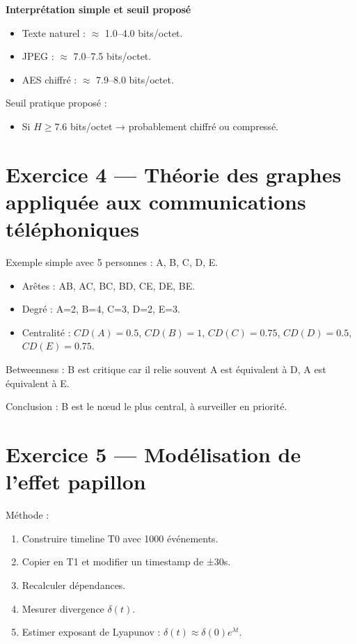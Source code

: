 \documentclass[12pt,a4paper]{article}
\begin{document}
	\textbf{Interprétation simple et seuil proposé}  
	\begin{itemize}
		\item Texte naturel : $\approx$ 1.0–4.0 bits/octet.
		\item JPEG : $\approx$ 7.0–7.5 bits/octet.
		\item AES chiffré : $\approx$ 7.9–8.0 bits/octet.
	\end{itemize}
	
	Seuil pratique proposé :  
	\begin{itemize}
		\item Si $H \geq 7.6$ bits/octet → probablement chiffré ou compressé.
	\end{itemize}
	
	\section*{Exercice 4 — Théorie des graphes appliquée aux communications téléphoniques}
	
	Exemple simple avec 5 personnes : A, B, C, D, E.
	
	\begin{itemize}
		\item Arêtes : AB, AC, BC, BD, CE, DE, BE.
		\item Degré : A=2, B=4, C=3, D=2, E=3.
		\item Centralité : $CD(A)=0.5$, $CD(B)=1$, $CD(C)=0.75$, $CD(D)=0.5$, $CD(E)=0.75$.
	\end{itemize}
	
	Betweenness : B est critique car il relie souvent A est équivalent à D, A est équivalent à E.  
	
	Conclusion : B est le nœud le plus central, à surveiller en priorité.
	
	\section*{Exercice 5 — Modélisation de l’effet papillon}
	
	Méthode :  
	\begin{enumerate}
		\item Construire timeline T0 avec 1000 événements.
		\item Copier en T1 et modifier un timestamp de ±30s.
		\item Recalculer dépendances.
		\item Mesurer divergence $\delta(t)$.
		\item Estimer exposant de Lyapunov : $\delta(t) \approx \delta(0)e^{\lambda t}$.
	\end{enumerate}
	
\end{document}
